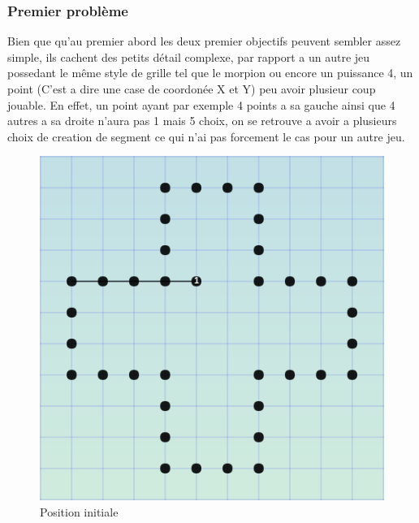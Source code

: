 \documentclass[11pt]{article}
\begin{document}
	\subsubsection{Premier problème}
	Bien que qu'au premier abord les deux premier objectifs peuvent sembler assez simple, ils cachent des petits détail complexe, par rapport a un autre jeu possedant le même style de grille tel que le morpion  ou encore un puissance 4, un point (C'est a dire une case de coordonée X et Y) peu avoir plusieur coup jouable. En effet, un point ayant par exemple 4 points a sa gauche ainsi que 4 autres a sa droite n'aura pas 1 mais 5 choix, on se retrouve a avoir a plusieurs choix de creation de segment ce qui n'ai pas forcement le cas pour un autre jeu.
\begin{figure}[htp]
\centering
\includegraphics[scale=1.00]{position1.png}
\caption{Position initiale}
\label{}
\end{figure}
\end{document}
